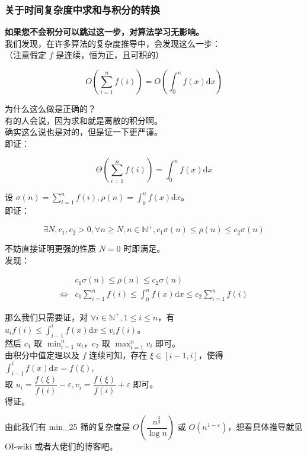 \documentclass[
]{article}
\begin{document}
\subsubsection{\texorpdfstring{关于时间复杂度中求和与积分的转换
}{关于时间复杂度中求和与积分的转换 }}\label{ux5173ux4e8eux65f6ux95f4ux590dux6742ux5ea6ux4e2dux6c42ux548cux4e0eux79efux5206ux7684ux8f6cux6362}

\textbf{如果您不会积分可以跳过这一步，对算法学习无影响。}\\
我们发现，在许多算法的复杂度推导中，会发现这么一步：\\
（注意假定 \(f\) 是连续，恒为正，且可积的）

\[O(\sum_{i=1}^nf(i))=O(\int_0^nf(x)\mathrm{d}x)\]

为什么这么做是正确的？\\
有的人会说，因为求和就是离散的积分啊。\\
确实这么说也是对的，但是证一下更严谨。\\
即证：

\[\Theta(\sum_{i=1}^nf(i))=\int_0^nf(x)\mathrm{d}x\]

设
\(\sigma(n)=\displaystyle\sum_{i=1}^nf(i),\rho(n)=\displaystyle\int_0^nf(x)\mathrm{d}x\)。\\
即证：

\[\exists N,c_1,c_2>0,\forall n\ge N,n\in\mathbb{N}^+,c_1\sigma(n)\le\rho(n)\le c_2\sigma(n)\]

不妨直接证明更强的性质 \(N=0\) 时即满足。 \\
发现：

$$
\begin{aligned}
&c_1\sigma(n)\le\rho(n)\le c_2\sigma(n)\\
\iff&c_1\sum_{i=1}^nf(i)\le\int_0^nf(x)\mathrm{d}x\le c_2\sum_{i=1}^nf(i)
\end{aligned}
$$

那么我们只需要证，对 \(\forall i\in\mathbb{N}^+,1\le i\le n\)，有
\(u_{i}f(i)\le\displaystyle\int_{i-1}^if(x)\mathrm{d}x\le v_if(i)\)。\\
然后 \(c_1\) 取 \(\displaystyle\min_{i=1}^n u_i\)，\(c_2\) 取
\(\displaystyle\max_{i=1}^n v_i\) 即可。\\
由积分中值定理以及 \(f\) 连续可知，存在 \(\xi\in[i-1,i]\)，使得
\(\displaystyle\int_{i-1}^if(x)\mathrm{d}x=f(\xi)\),\\
取
\(u_i=\dfrac{f(\xi)}{f(i)}-\varepsilon,v_i=\dfrac{f(\xi)}{f(i)}+\varepsilon\)
即可。\\
得证。

由此我们有 min\_25 筛的复杂度是 \(O(\dfrac{n^{\frac{3}{4}}}{\log n})\)
或 \(O(n^{1-\varepsilon})\)，想看具体推导就见 OI-wiki
或者大佬们的博客吧。
\end{document}
